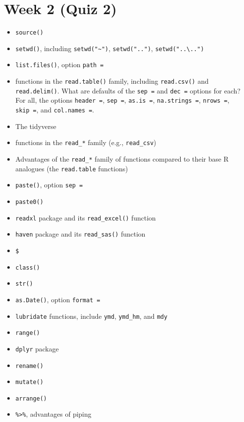 \documentclass[]{book}
\providecommand{\tightlist}{%
  \setlength{\itemsep}{0pt}\setlength{\parskip}{0pt}}
\begin{document}
\section{Week 2 (Quiz 2)}\label{week-2-quiz-2}

\begin{itemize}
\tightlist
\item
  \texttt{source()}
\item
  \texttt{setwd()}, including \texttt{setwd("\textasciitilde{}")},
  \texttt{setwd("..")}, \texttt{setwd("..\textbackslash{}..")}
\item
  \texttt{list.files()}, option \texttt{path\ =}
\item
  functions in the \texttt{read.table()} family, including
  \texttt{read.csv()} and \texttt{read.delim()}. What are defaults of
  the \texttt{sep\ =} and \texttt{dec\ =} options for each? For all, the
  options \texttt{header\ =}, \texttt{sep\ =}, \texttt{as.is\ =},
  \texttt{na.strings\ =}, \texttt{nrows\ =}, \texttt{skip\ =}, and
  \texttt{col.names\ =}.
\item
  The tidyverse
\item
  functions in the \texttt{read\_*} family (e.g., \texttt{read\_csv})
\item
  Advantages of the \texttt{read\_*} family of functions compared to
  their base R analogues (the \texttt{read.table} functions)
\item
  \texttt{paste()}, option \texttt{sep\ =}
\item
  \texttt{paste0()}
\item
  \texttt{readxl} package and its \texttt{read\_excel()} function
\item
  \texttt{haven} package and its \texttt{read\_sas()} function
\item
  \texttt{\$}
\item
  \texttt{class()}
\item
  \texttt{str()}
\item
  \texttt{as.Date()}, option \texttt{format\ =}
\item
  \texttt{lubridate} functions, include \texttt{ymd}, \texttt{ymd\_hm},
  and \texttt{mdy}
\item
  \texttt{range()}
\item
  \texttt{dplyr} package
\item
  \texttt{rename()}
\item
  \texttt{mutate()}
\item
  \texttt{arrange()}
\item
  \texttt{\%\textgreater{}\%}, advantages of piping

\end{itemize}
\end{document}
